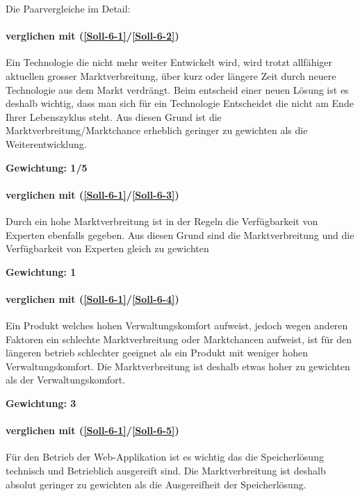 Die Paarvergleiche im Detail:


\paragraph*{ verglichen mit  (\ref{Soll-6-1}/\ref{Soll-6-2})} Ein Technologie die nicht mehr weiter Entwickelt wird, wird trotzt allfähiger aktuellen grosser Marktverbreitung, über kurz oder längere Zeit durch neuere Technologie aus dem Markt verdrängt. Beim entscheid einer neuen Lösung ist es deshalb wichtig, dass man sich für ein Technologie Entscheidet die nicht am Ende Ihrer Lebenszyklus steht. Aus diesen Grund ist die Marktverbreitung/Marktchance erheblich geringer zu gewichten als die Weiterentwicklung.

\textbf{Gewichtung: 1/5}


\paragraph*{ verglichen mit  (\ref{Soll-6-1}/\ref{Soll-6-3})}
Durch ein hohe Marktverbreitung ist in der Regeln die Verfügbarkeit von Experten ebenfalls gegeben. Aus diesen Grund sind die Marktverbreitung und die Verfügbarkeit von Experten gleich zu gewichten

\textbf{Gewichtung: 1}

\paragraph*{ verglichen mit  (\ref{Soll-6-1}/\ref{Soll-6-4})}
Ein Produkt welches hohen Verwaltungskomfort aufweist, jedoch wegen anderen Faktoren ein schlechte Marktverbreitung oder Marktchancen aufweist, ist für den längeren betrieb schlechter geeignet als ein Produkt mit weniger hohen Verwaltungskomfort. Die Marktverbreitung ist deshalb etwas hoher zu gewichten als der Verwaltungskomfort.

\textbf{Gewichtung: 3}

\paragraph*{ verglichen mit  (\ref{Soll-6-1}/\ref{Soll-6-5})}
Für den Betrieb der Web-Applikation ist es wichtig das die Speicherlösung technisch und Betrieblich ausgereift sind. Die Marktverbreitung ist deshalb absolut geringer zu gewichten als die Ausgereifheit der Speicherlösung.

